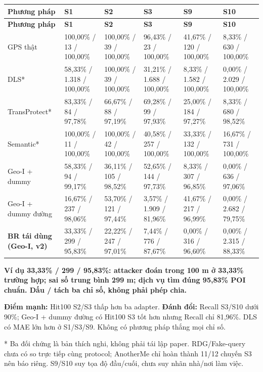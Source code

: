 \documentclass[10pt,a4paper]{article}
\newcommand{\key}[1]{\par\smallskip\noindent\colorbox{pale}{\parbox{\dimexpr\linewidth-2\fboxsep}{\textbf{#1}}}\par\smallskip}
\begin{document}
\begingroup\small
\begin{longtable}{@{}P{2.804cm}P{2.598cm}P{2.598cm}P{2.598cm}P{2.598cm}P{2.598cm}@{}}
\toprule
\textbf{Phương pháp} & \textbf{S1} & \textbf{S2} & \textbf{S3} & \textbf{S9} & \textbf{S10}\\\midrule
\endfirsthead
\toprule
\textbf{Phương pháp} & \textbf{S1} & \textbf{S2} & \textbf{S3} & \textbf{S9} & \textbf{S10}\\\midrule
\endhead
\bottomrule\endfoot
GPS thật & 100,00\% / 13 / 100,00\% & 100,00\% / 39 / 100,00\% & 96,43\% / 23 / 100,00\% & 41,67\% / 120 / 100,00\% & 8,33\% / 630 / 100,00\%\\
\addlinespace[3pt]
DLS* & 58,33\% / 1.318 / 100,00\% & 100,00\% / 39 / 100,00\% & 31,21\% / 1.688 / 100,00\% & 8,33\% / 1.582 / 100,00\% & 0,00\% / 2.029 / 100,00\%\\
\addlinespace[3pt]
TransProtect* & 83,33\% / 84 / 97,78\% & 66,67\% / 88 / 97,19\% & 69,28\% / 99 / 97,93\% & 25,00\% / 184 / 97,27\% & 8,33\% / 680 / 98,52\%\\
\addlinespace[3pt]
Semantic* & 100,00\% / 11 / 100,00\% & 100,00\% / 42 / 100,00\% & 40,58\% / 257 / 100,00\% & 33,33\% / 132 / 100,00\% & 16,67\% / 731 / 100,00\%\\
\addlinespace[3pt]
Geo-I + dummy & 58,33\% / 94 / 99,17\% & 36,11\% / 105 / 98,52\% & 52,65\% / 144 / 97,73\% & 8,33\% / 307 / 96,85\% & 0,00\% / 636 / 97,06\%\\
\addlinespace[3pt]
Geo-I + dummy đường & 16,67\% / 237 / 98,06\% & 53,70\% / 121 / 97,44\% & 3,57\% / 1.909 / 81,96\% & 41,67\% / 217 / 96,99\% & 0,00\% / 2.682 / 79,75\%\\
\addlinespace[3pt]
\textbf{BR tái dùng (Geo-I, v2)} & 33,33\% / 299 / 95,83\% & 22,22\% / 247 / 97,01\% & 7,44\% / 776 / 87,67\% & 0,00\% / 316 / 96,60\% & 0,00\% / 2.315 / 88,33\%\\
\end{longtable}
\endgroup
\key{Ví dụ 33,33\% / 299 / 95,83\%: attacker đoán trong 100 m ở 33,33\% trường hợp; sai số trung bình 299 m; dịch vụ tìm đúng 95,83\% POI chuẩn. Dấu / tách ba chỉ số, không phải phép chia.}

\textbf{Điểm mạnh:} Hit100 S2/S3 thấp hơn ba adapter. \textbf{Đánh đổi:} Recall S3/S10 dưới 90\%; Geo-I + dummy đường có Hit100 S3 tốt hơn nhưng Recall chỉ 81,96\%. DLS có MAE lớn hơn ở S1/S3/S9. Không có phương pháp thắng mọi chỉ số.

* Ba đối chứng là bản thích nghi, không phải tái lập paper. RDG/Fake-query chưa có so trực tiếp cùng protocol; AnotherMe chỉ hoàn thành 11/12 chuyến S3 nên báo riêng. S9/S10 suy tọa độ đầu/cuối, chưa suy nhãn nhà/nơi làm việc.
\end{document}
